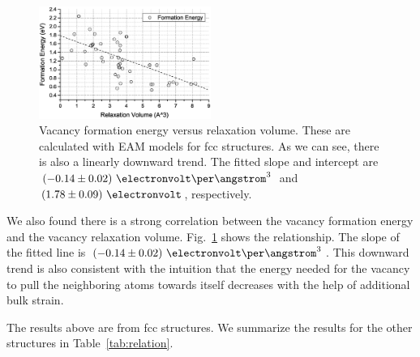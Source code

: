 \documentclass[%
 reprint,
 amsmath,amssymb,
 aps,
]{revtex4-1}
\begin{document}
\begin{figure}
\centering
\includegraphics[width=0.5\textwidth, clip, trim = 10mm 3mm 10mm 10mm]{vfe_vs_vrv}%
\caption{\label{fig:vfevsvrv}
Vacancy formation energy versus relaxation volume.
These are calculated with EAM models for fcc structures.
As we can see, there is also a linearly downward trend.
The fitted slope and intercept are $(-0.14\pm0.02)~\electronvolt\per\angstrom^3$ and $(1.78\pm0.09)~\electronvolt$, respectively.
}
\end{figure}

We also found there is a strong correlation between the vacancy formation energy and the vacancy relaxation volume.
Fig.~\ref{fig:vfevsvrv} shows the relationship.
The slope of the fitted line is $(-0.14\pm0.02)~\electronvolt\per\angstrom^3$.
This downward trend is also consistent with the intuition that the energy needed for the vacancy to pull the neighboring atoms towards itself decreases with the help of additional bulk strain.

The results above are from fcc structures.
We summarize the results for the other structures in Table~\ref{tab:relation}.
\end{document}

